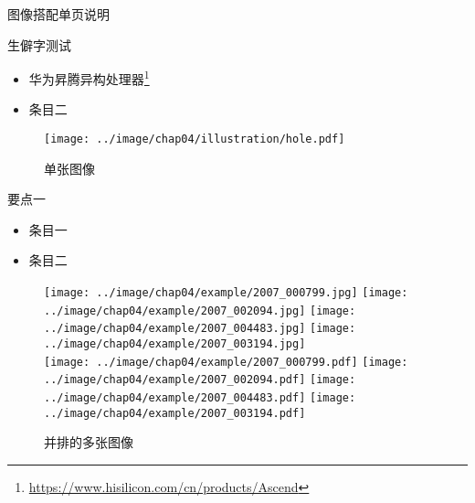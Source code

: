 \documentclass{sysupptthesis}
\begin{document}
\begin{frame}[allowframebreaks]{图像搭配单页说明}

    \begin{block}{生僻字测试}
        \begin{itemize}
            \item 华为昇腾异构处理器\footnote{\url{https://www.hisilicon.com/cn/products/Ascend}}
            \item 条目二
        \end{itemize}
    \end{block}

    \begin{figure}[!htb]
        \texttt{[image: ../image/chap04/illustration/hole.pdf]}
        \caption{单张图像}
        \label{fig:hole}
    \end{figure}

    \newpage

    \begin{block}{要点一}
        \begin{itemize}
            \item 条目一
            \item 条目二
        \end{itemize}
    \end{block}

    \begin{figure} %
        \centering
        \texttt{[image: ../image/chap04/example/2007\_000799.jpg]}
        \texttt{[image: ../image/chap04/example/2007\_002094.jpg]}
        \texttt{[image: ../image/chap04/example/2007\_004483.jpg]}
        \texttt{[image: ../image/chap04/example/2007\_003194.jpg]}
        \\
        \texttt{[image: ../image/chap04/example/2007\_000799.pdf]}
        \texttt{[image: ../image/chap04/example/2007\_002094.pdf]}
        \texttt{[image: ../image/chap04/example/2007\_004483.pdf]}
        \texttt{[image: ../image/chap04/example/2007\_003194.pdf]}
        \caption{并排的多张图像}
        \label{fig:multi-image-example1}
    \end{figure}

\end{frame}
\end{document}

